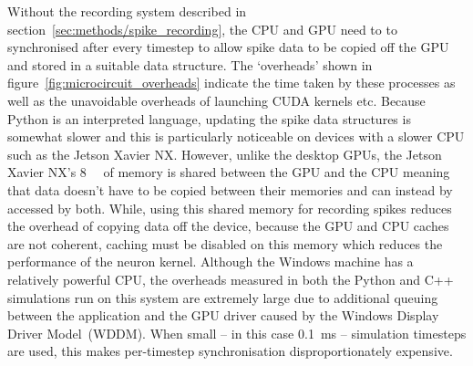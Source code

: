 \documentclass[utf8]{frontiersSCNS} %
\begin{document}
Without the recording system described in section~\ref{sec:methods/spike_recording}, the CPU and GPU need to to synchronised after every timestep to allow spike data to be copied off the GPU and stored in a suitable data structure.
The `overheads' shown in figure~\ref{fig:microcircuit_overheads} indicate the time taken by these processes as well as the unavoidable overheads of launching CUDA kernels etc.
Because Python is an interpreted language, updating the spike data structures is somewhat slower and this is particularly noticeable on devices with a slower CPU such as the Jetson Xavier NX.
However, unlike the desktop GPUs, the Jetson Xavier NX's \SI{8}{\giga\byte} of memory is shared between the GPU and the CPU meaning that data doesn't have to be copied between their memories and can instead by accessed by both.
While, using this shared memory for recording spikes reduces the overhead of copying data off the device, because the GPU and CPU caches are not coherent, caching must be disabled on this memory which reduces the performance of the neuron kernel.
Although the Windows machine has a relatively powerful CPU, the overheads measured in both the Python and C++ simulations run on this system are extremely large due to additional queuing between the application and the GPU driver  caused by the Windows Display Driver Model~(WDDM).
When small -- in this case \SI{0.1}{\milli\second} -- simulation timesteps are used, this makes per-timestep synchronisation disproportionately expensive.
\end{document}
